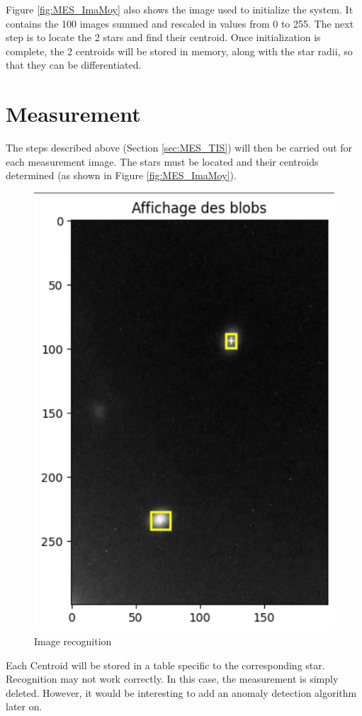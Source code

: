 Figure \ref{fig:MES_ImaMoy} also shows the image used to initialize the system. It contains the 100 images summed and rescaled in values from 0 to 255.
The next step is to locate the 2 stars and find their centroid.
Once initialization is complete, the 2 centroids will be stored in memory, along with the star radii, so that they can
be differentiated.
\newpage
\section{Measurement}
The steps described above (Section \ref{sec:MES_TIS}) will then be carried out for each measurement image.
The stars must be located and their centroids determined (as shown in Figure \ref{fig:MES_ImaMoy}).
\begin{figure}[H]
    \centering
    \includegraphics[scale=0.75]{assets/figures/MesuresResultats/BlobsInit.png}
    \caption{Image recognition}
    \label{fig:MES_ImaBlob}
\end{figure}
Each Centroid will be stored in a table specific to the corresponding star.
\newline
Recognition may not work correctly. In this case, the measurement is simply deleted.
However, it would be interesting to add an anomaly detection algorithm later on.
\newpage

